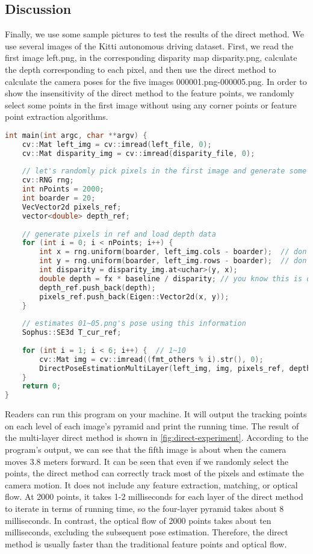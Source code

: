 \subsection{Discussion}
Finally, we use some sample pictures to test the results of the direct method. We use several images of the Kitti {\cite{Geiger2013}} autonomous driving dataset. First, we read the first image left.png, in the corresponding disparity map disparity.png, calculate the depth corresponding to each pixel, and then use the direct method to calculate the camera poses for the five images 000001.png-000005.png. In order to show the insensitivity of the direct method to the feature points, we randomly select some points in the first image without using any corner points or feature point extraction algorithms.
\begin{lstlisting}[language=c++,caption=slambook2/ch8/direct_method.cpp (part)]
int main(int argc, char **argv) {
	cv::Mat left_img = cv::imread(left_file, 0);
	cv::Mat disparity_img = cv::imread(disparity_file, 0);
	
	// let's randomly pick pixels in the first image and generate some 3d points in the first image's frame
	cv::RNG rng;
	int nPoints = 2000;
	int boarder = 20;
	VecVector2d pixels_ref;
	vector<double> depth_ref;
	
	// generate pixels in ref and load depth data
	for (int i = 0; i < nPoints; i++) {
		int x = rng.uniform(boarder, left_img.cols - boarder);  // don't pick pixels close to boarder
		int y = rng.uniform(boarder, left_img.rows - boarder);  // don't pick pixels close to boarder
		int disparity = disparity_img.at<uchar>(y, x);
		double depth = fx * baseline / disparity; // you know this is disparity to depth
		depth_ref.push_back(depth);
		pixels_ref.push_back(Eigen::Vector2d(x, y));
	}
	
	// estimates 01~05.png's pose using this information
	Sophus::SE3d T_cur_ref;
	
	for (int i = 1; i < 6; i++) {  // 1~10
		cv::Mat img = cv::imread((fmt_others % i).str(), 0);
		DirectPoseEstimationMultiLayer(left_img, img, pixels_ref, depth_ref, T_cur_ref);
	}
	return 0;
}
\end{lstlisting}

Readers can run this program on your machine. It will output the tracking points on each level of each image's pyramid and print the running time. The result of the multi-layer direct method is shown in \autoref{fig:direct-experiment}. According to the program's output, we can see that the fifth image is about when the camera moves 3.8 meters forward. It can be seen that even if we randomly select the points, the direct method can correctly track most of the pixels and estimate the camera motion. It does not include any feature extraction, matching, or optical flow. At 2000 points, it takes 1-2 milliseconds for each layer of the direct method to iterate in terms of running time, so the four-layer pyramid takes about 8 milliseconds. In contrast, the optical flow of 2000 points takes about ten milliseconds, excluding the subsequent pose estimation. Therefore, the direct method is usually faster than the traditional feature points and optical flow.

